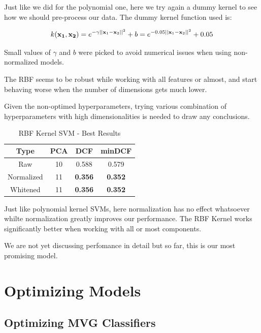\documentclass[12pt, twocolumn]{article}
\begin{document}
Just like we did for the polynomial one, here we try again a dummy kernel to see how we should pre-process our data.
The dummy kernel function used is: 

$$\displaystyle k({\bf x_1}, {\bf x_2}) = e^{-\gamma||{\bf x}_1 - {\bf x}_2||^2} + b = e^{-0.05||{\bf x}_1 - {\bf x}_2||^2} + 0.05 $$

Small values of $\gamma$ and $b$ were picked to avoid numerical issues when using non-normalized models.

The RBF seems to be robust while working with all features or almost, and start behaving worse when the number of dimensions gets much lower.

Given the non-optimed hyperparameters, trying various combination of hyperparameters with high dimensionalities is needed to draw any conclusions.

\begin{table}[H]
    \centering
        \begin{tabular}{||c|c|c|c||}
            \hline
            Type & PCA & DCF & minDCF \\
            \hline
            \hline
                Raw & 10 & 0.588 & 0.579 \\ 
                Normalized & 11 & {\bf 0.356} & {\bf 0.352} \\ 
                Whitened & 11 & {\bf 0.356} & {\bf 0.352} \\ 
            \hline
    \end{tabular}
    \caption{RBF Kernel SVM - Best Results}
\end{table}

Just like polynomial kernel SVMs, here normalization has no effect whatsoever whilte normalization greatly improves our performance.
The RBF Kernel works significantly better when working with all or most components. 

We are not yet discussing perfomance in detail but so far, this is our most promising model.


\section{Optimizing Models}
\subsection{Optimizing MVG Classifiers}
\end{document}
